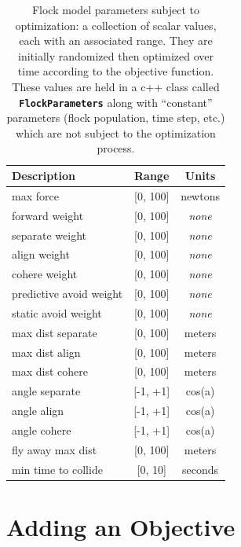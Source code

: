 \documentclass[letterpaper]{article}
\newcommand{\code}[1]{\textbf{\small \texttt{#1}}}
\begin{document}
\begin{table}[t]
\centering
\begin{tabular}{ | l | c | c | }
    \hline
    \textbf{Description} & \textbf{Range} & \textbf{Units} \\
    \hline
    max force & [0, 100] & newtons \\
    forward weight & [0, 100] & \textit{none} \\
    separate weight & [0, 100] & \textit{none} \\
    align weight & [0, 100] & \textit{none} \\
    cohere weight & [0, 100] & \textit{none} \\
    predictive avoid weight & [0, 100] & \textit{none} \\
    static avoid weight & [0, 100] & \textit{none} \\
    max dist separate & [0, 100] & meters \\
    max dist align & [0, 100] & meters \\
    max dist cohere & [0, 100] & meters \\
    angle separate & [-1, +1] & cos(a) \\
    angle align & [-1, +1] & cos(a) \\
    angle cohere & [-1, +1] & cos(a) \\
    fly away max dist & [0, 100] & meters \\
    min time to collide & [0, 10] & seconds \\
    \hline
\end{tabular}
\caption{Flock model parameters subject to optimization: a collection of scalar values, each with an associated range. They are initially randomized then optimized over time according to the objective function. These values are held in a c++ class called \code{FlockParameters} along with ``constant'' parameters (flock population, time step, etc.) which are not subject to the optimization process.}
\label{table:flock-parameters}
\end{table}



\section{Adding an Objective}
\label{sec:add_objective}
\end{document}
